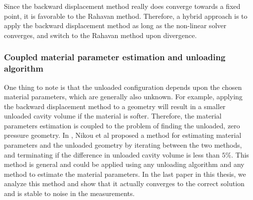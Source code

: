 Since the backward displacement method really does converge towards a
fixed point, it is favorable to the Rahavan method. Therefore, a
hybrid approach is to apply the backward displacement method as
long as the non-linear solver converges, and switch to the Rahavan
method upon divergence.


\subsubsection{Coupled material parameter estimation and unloading
  algorithm}
\label{sec:intro_coupled_material}
One thing to note is that the unloaded configuration depends upon the
chosen material parameters, which are generally also unknown. For
example, applying the backward displacement method to a geometry will
result in a smaller unloaded cavity volume if the material is softer.
Therefore, the material parameters estimation is coupled to the
problem of finding the unloaded, zero pressure geometry.
In \cite{nikou2016effects}, Nikou et al proposed a method for estimating
material parameters and the unloaded geometry by iterating between
the two methods, and terminating if the difference in unloaded cavity
volume is less than $5 \%$. This method is general and could be applied
using any unloading algorithm and any method to estimate the material
parameters. In the last paper in this thesis, we analyze this method
and show that it actually converges to the correct solution and is
stable to noise in the measurements. 


  
